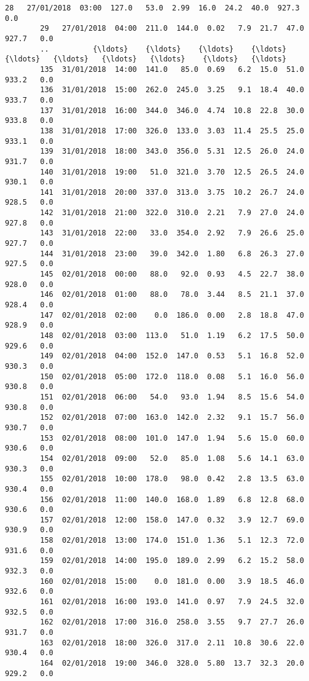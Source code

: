\documentclass[11pt]{article}
\begin{document}
\begin{Verbatim}[commandchars=\\\{\}]
        28   27/01/2018  03:00  127.0   53.0  2.99  16.0  24.2  40.0  927.3   0.0   
        29   27/01/2018  04:00  211.0  144.0  0.02   7.9  21.7  47.0  927.7   0.0   
        ..          {\ldots}    {\ldots}    {\ldots}    {\ldots}   {\ldots}   {\ldots}   {\ldots}   {\ldots}    {\ldots}   {\ldots}   
        135  31/01/2018  14:00  141.0   85.0  0.69   6.2  15.0  51.0  933.2   0.0   
        136  31/01/2018  15:00  262.0  245.0  3.25   9.1  18.4  40.0  933.7   0.0   
        137  31/01/2018  16:00  344.0  346.0  4.74  10.8  22.8  30.0  933.8   0.0   
        138  31/01/2018  17:00  326.0  133.0  3.03  11.4  25.5  25.0  933.1   0.0   
        139  31/01/2018  18:00  343.0  356.0  5.31  12.5  26.0  24.0  931.7   0.0   
        140  31/01/2018  19:00   51.0  321.0  3.70  12.5  26.5  24.0  930.1   0.0   
        141  31/01/2018  20:00  337.0  313.0  3.75  10.2  26.7  24.0  928.5   0.0   
        142  31/01/2018  21:00  322.0  310.0  2.21   7.9  27.0  24.0  927.8   0.0   
        143  31/01/2018  22:00   33.0  354.0  2.92   7.9  26.6  25.0  927.7   0.0   
        144  31/01/2018  23:00   39.0  342.0  1.80   6.8  26.3  27.0  927.5   0.0   
        145  02/01/2018  00:00   88.0   92.0  0.93   4.5  22.7  38.0  928.0   0.0   
        146  02/01/2018  01:00   88.0   78.0  3.44   8.5  21.1  37.0  928.4   0.0   
        147  02/01/2018  02:00    0.0  186.0  0.00   2.8  18.8  47.0  928.9   0.0   
        148  02/01/2018  03:00  113.0   51.0  1.19   6.2  17.5  50.0  929.6   0.0   
        149  02/01/2018  04:00  152.0  147.0  0.53   5.1  16.8  52.0  930.3   0.0   
        150  02/01/2018  05:00  172.0  118.0  0.08   5.1  16.0  56.0  930.8   0.0   
        151  02/01/2018  06:00   54.0   93.0  1.94   8.5  15.6  54.0  930.8   0.0   
        152  02/01/2018  07:00  163.0  142.0  2.32   9.1  15.7  56.0  930.7   0.0   
        153  02/01/2018  08:00  101.0  147.0  1.94   5.6  15.0  60.0  930.6   0.0   
        154  02/01/2018  09:00   52.0   85.0  1.08   5.6  14.1  63.0  930.3   0.0   
        155  02/01/2018  10:00  178.0   98.0  0.42   2.8  13.5  63.0  930.4   0.0   
        156  02/01/2018  11:00  140.0  168.0  1.89   6.8  12.8  68.0  930.6   0.0   
        157  02/01/2018  12:00  158.0  147.0  0.32   3.9  12.7  69.0  930.9   0.0   
        158  02/01/2018  13:00  174.0  151.0  1.36   5.1  12.3  72.0  931.6   0.0   
        159  02/01/2018  14:00  195.0  189.0  2.99   6.2  15.2  58.0  932.3   0.0   
        160  02/01/2018  15:00    0.0  181.0  0.00   3.9  18.5  46.0  932.6   0.0   
        161  02/01/2018  16:00  193.0  141.0  0.97   7.9  24.5  32.0  932.5   0.0   
        162  02/01/2018  17:00  316.0  258.0  3.55   9.7  27.7  26.0  931.7   0.0   
        163  02/01/2018  18:00  326.0  317.0  2.11  10.8  30.6  22.0  930.4   0.0   
        164  02/01/2018  19:00  346.0  328.0  5.80  13.7  32.3  20.0  929.2   0.0   
        

\end{Verbatim}
\end{document}
